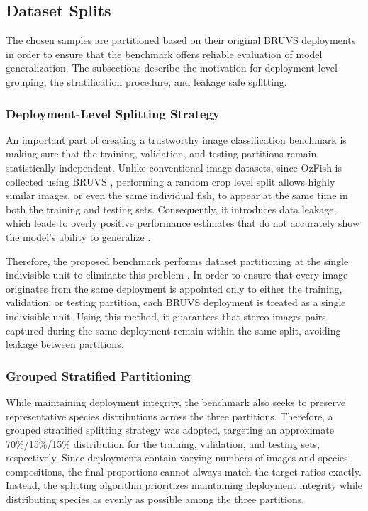 \documentclass[preprint,12pt]{elsarticle}
\begin{document}
\subsection{\texorpdfstring{Dataset Splits
}{Dataset Splits }}\label{dataset-splits}

The chosen samples are partitioned based on their original BRUVS
deployments in order to ensure that the benchmark offers reliable
evaluation of model generalization. The subsections describe the
motivation for deployment-level grouping, the stratification procedure,
and leakage safe splitting.

\subsubsection{Deployment-Level Splitting
Strategy}\label{deployment-level-splitting-strategy}

An important part of creating a trustworthy image classification
benchmark is making sure that the training, validation, and testing
partitions remain statistically independent. Unlike conventional image
datasets, since OzFish is collected using BRUVS
\citep{ref4,ref22}, performing a random crop level
split allows highly similar images, or even the same individual fish, to
appear at the same time in both the training and testing sets.
Consequently, it introduces data leakage, which leads to overly positive
performance estimates that do not accurately show the model's ability to
generalize \citep{ref17,ref18,ref20}.

Therefore, the proposed benchmark performs dataset partitioning at the
single indivisible unit to eliminate this problem
\citep{ref17}. In order to ensure that every
image originates from the same deployment is appointed only to either
the training, validation, or testing partition, each BRUVS deployment is
treated as a single indivisible unit. Using this method, it guarantees
that stereo images pairs captured during the same deployment
\citep{ref4,ref19}
remain within the same split, avoiding leakage between partitions.

\subsubsection{Grouped Stratified
Partitioning}\label{grouped-stratified-partitioning}

While maintaining deployment integrity, the benchmark also seeks to
preserve representative species distributions across the three
partitions. Therefore, a grouped stratified splitting strategy was
adopted, targeting an approximate 70\%/15\%/15\% distribution for the
training, validation, and testing sets, respectively. Since deployments
contain varying numbers of images and species compositions, the final
proportions cannot always match the target ratios exactly. Instead, the
splitting algorithm prioritizes maintaining deployment integrity while
distributing species as evenly as possible among the three partitions.
\end{document}
